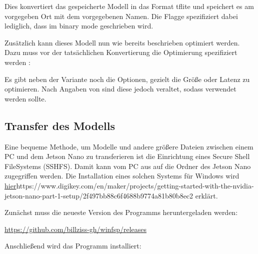 


\medskip

Dies konvertiert das gespeicherte Modell in das Format tflite und speichert es am vorgegeben Ort mit dem vorgegebenen Namen. \cite{Google.04.11.2020} Die Flagge  spezifiziert dabei lediglich, dass im binary mode geschrieben wird.

Zusätzlich kann dieses Modell nun wie bereits beschrieben optimiert werden. Dazu muss vor der tatsächlichen Konvertierung die Optimierung spezifiziert werden \cite{Warden:2020}:

\medskip


\medskip

Es gibt neben der Variante  noch die Optionen, gezielt die Größe oder Latenz zu optimieren. Nach Angaben von \cite{Google.13.01.2021} sind diese jedoch veraltet, sodass  verwendet werden sollte.

\subsection{Transfer des Modells}

Eine bequeme Methode, um Modelle und andere größere Dateien zwischen einem PC und dem Jetson Nano zu transferieren ist die Einrichtung eines Secure Shell FileSystems (SSHFS). Damit kann vom PC aus auf die Ordner des Jetson Nano zugegriffen werden. Die Installation eines solchen Systems für Windows wird  \url{hier}{https://www.digikey.com/en/maker/projects/getting-started-with-the-nvidia-jetson-nano-part-1-setup/2f497bb88c6f4688b9774a81b80b8ec2} erklärt.  

Zunächst muss die neueste Version des Programms  heruntergeladen werden:


\medskip

\url{https://github.com/billziss-gh/winfsp/releases}


\medskip

Anschließend wird das Programm  installiert: 

